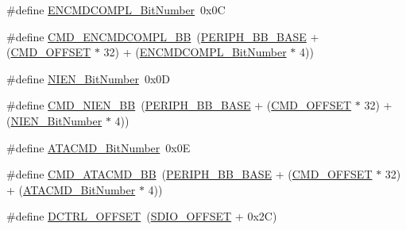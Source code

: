\begin{DoxyCompactItemize}
\item 
\#define \hyperlink{group___s_d_i_o___private___types_definitions_ga1d1112c7b804791a0fffd8b317085aeb}{E\+N\+C\+M\+D\+C\+O\+M\+P\+L\+\_\+\+Bit\+Number}~0x0C
\item 
\#define \hyperlink{group___s_d_i_o___private___types_definitions_gade06098d1616639ce5f1b70675280b7c}{C\+M\+D\+\_\+\+E\+N\+C\+M\+D\+C\+O\+M\+P\+L\+\_\+\+BB}~(\hyperlink{openmotestm_2library_2inc_2stm32f10x__map_8h_aed7efc100877000845c236ccdc9e144a}{P\+E\+R\+I\+P\+H\+\_\+\+B\+B\+\_\+\+B\+A\+SE} + (\hyperlink{openmotestm_2library_2src_2stm32f10x__sdio_8c_af12d26702ce7a88d2a3dae87f000b75e}{C\+M\+D\+\_\+\+O\+F\+F\+S\+ET} $\ast$ 32) + (\hyperlink{openmotestm_2library_2src_2stm32f10x__sdio_8c_a1d1112c7b804791a0fffd8b317085aeb}{E\+N\+C\+M\+D\+C\+O\+M\+P\+L\+\_\+\+Bit\+Number} $\ast$ 4))
\item 
\#define \hyperlink{group___s_d_i_o___private___types_definitions_gab6d83a7ccd4a0d9ea9a09fec263fb25f}{N\+I\+E\+N\+\_\+\+Bit\+Number}~0x0D
\item 
\#define \hyperlink{group___s_d_i_o___private___types_definitions_ga08623f1d053677de8b20a6f5f5090edd}{C\+M\+D\+\_\+\+N\+I\+E\+N\+\_\+\+BB}~(\hyperlink{openmotestm_2library_2inc_2stm32f10x__map_8h_aed7efc100877000845c236ccdc9e144a}{P\+E\+R\+I\+P\+H\+\_\+\+B\+B\+\_\+\+B\+A\+SE} + (\hyperlink{openmotestm_2library_2src_2stm32f10x__sdio_8c_af12d26702ce7a88d2a3dae87f000b75e}{C\+M\+D\+\_\+\+O\+F\+F\+S\+ET} $\ast$ 32) + (\hyperlink{openmotestm_2library_2src_2stm32f10x__sdio_8c_ab6d83a7ccd4a0d9ea9a09fec263fb25f}{N\+I\+E\+N\+\_\+\+Bit\+Number} $\ast$ 4))
\item 
\#define \hyperlink{group___s_d_i_o___private___types_definitions_gabd4fd3bb700b879f843ccc867db1832e}{A\+T\+A\+C\+M\+D\+\_\+\+Bit\+Number}~0x0E
\item 
\#define \hyperlink{group___s_d_i_o___private___types_definitions_gabb7e537f931b6fdd3b49e826f2e19d7c}{C\+M\+D\+\_\+\+A\+T\+A\+C\+M\+D\+\_\+\+BB}~(\hyperlink{openmotestm_2library_2inc_2stm32f10x__map_8h_aed7efc100877000845c236ccdc9e144a}{P\+E\+R\+I\+P\+H\+\_\+\+B\+B\+\_\+\+B\+A\+SE} + (\hyperlink{openmotestm_2library_2src_2stm32f10x__sdio_8c_af12d26702ce7a88d2a3dae87f000b75e}{C\+M\+D\+\_\+\+O\+F\+F\+S\+ET} $\ast$ 32) + (\hyperlink{openmotestm_2library_2src_2stm32f10x__sdio_8c_abd4fd3bb700b879f843ccc867db1832e}{A\+T\+A\+C\+M\+D\+\_\+\+Bit\+Number} $\ast$ 4))
\item 
\#define \hyperlink{group___s_d_i_o___private___types_definitions_ga948c1382c4cfd3af3e406c4d0cdd4240}{D\+C\+T\+R\+L\+\_\+\+O\+F\+F\+S\+ET}~(\hyperlink{openmotestm_2library_2src_2stm32f10x__sdio_8c_abf07aced03df5f46d57cea1d4f56d1e3}{S\+D\+I\+O\+\_\+\+O\+F\+F\+S\+ET} + 0x2\+C)

\end{DoxyCompactItemize}
